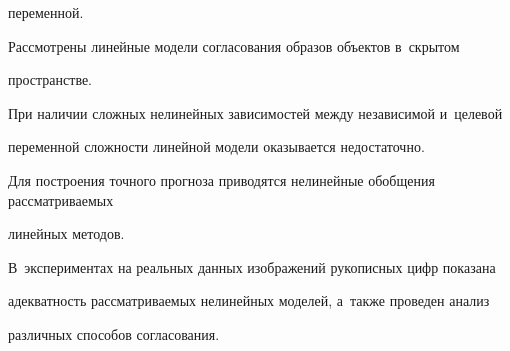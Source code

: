 переменной.

Рассмотрены линейные модели согласования образов объектов в~скрытом 

пространстве.

При наличии сложных нелинейных зависимостей между независимой и~целевой 

переменной сложности линейной модели оказывается недостаточно.

Для построения точного прогноза приводятся нелинейные обобщения рассматриваемых 

линейных методов.

В~экспериментах на реальных данных изображений рукописных цифр показана 

адекватность рассматриваемых нелинейных моделей, а~также проведен анализ 

различных способов согласования.





